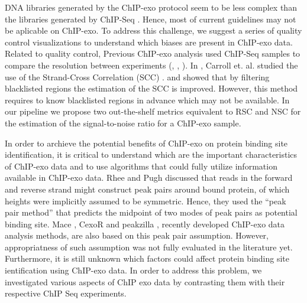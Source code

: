\documentclass{bmcart}\usepackage[]{graphicx}\usepackage[]{color}
\begin{document}
DNA libraries generated by the ChIP-exo protocol seem to be less
complex than the libraries generated by ChIP-Seq
\cite{exo_review}. Hence, most of current guidelines \cite{encode_qc}
may not be aplicable on ChIP-exo. To address this challenge, we
suggest a series of quality control visualizations to understand which
biases are present in ChIP-exo data. Related to quality control,
Previous ChIP-exo analysis used ChIP-Seq samples to compare the
resolution between experiments (\cite{exo1}, \cite{exo2},
\cite{exoillumina}). In \cite{carroll.qc}, Carroll et. al. studied the
use of the Strand-Cross Correlation (SCC) \cite{strandcc}. and showed
that by filtering blacklisted regions the estimation of the SCC is
improved. However, this method requires to know blacklisted regions in
advance which may not be available. In our pipeline we propose two
out-the-shelf metrics equivalent to RSC and NSC for the estimation of
the signal-to-noise ratio for a ChIP-exo sample.

In order to archieve the potential benefits of ChIP-exo on protein
binding site identification, it is critical to understand which are
the important characteristics of ChIP-exo data and to use algorithms
that could fully utilize information available in ChIP-exo data. Rhee
and Pugh \cite{exo1} discussed that reads in the forward and reverse
strand might construct peak pairs around bound protein, of which
heights were implicitly assumed to be symmetric. Hence, they used the
``peak pair method'' that predicts the midpoint of two modes of peak
pairs as potential binding site. Mace \cite{mace}, CexoR \cite{cexor}
and peakzilla \cite{peakzilla}, recently developed ChIP-exo data
analysis methods, are also based on this peak pair
assumption. However, appropriatness of such assumption was not fully
evaluated in the literature yet.  Furthermore, it is still unknown
which factors could affect protein binding site ientification using
ChIP-exo data. In order to address this problem, we investigated
various aspects of ChIP exo data by contrasting them with their
respective ChIP Seq experiments.
\end{document}
